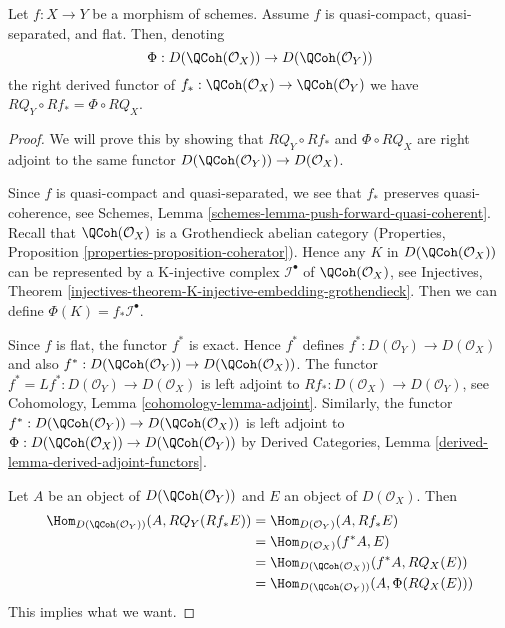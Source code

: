 \begin{lemma}
\label{lemma-flat-pushforward-coherator}
Let $f : X \to Y$ be a morphism of schemes. Assume $f$ is
quasi-compact, quasi-separated, and flat. Then, denoting
$$
\Phi : D(\QCoh(\mathcal{O}_X)) \to D(\QCoh(\mathcal{O}_Y))
$$
the right derived functor of
$f_* : \QCoh(\mathcal{O}_X) \to \QCoh(\mathcal{O}_Y)$
we have $RQ_Y \circ Rf_* = \Phi \circ RQ_X$.
\end{lemma}

\begin{proof}
We will prove this by showing that $RQ_Y \circ Rf_*$ and $\Phi \circ RQ_X$
are right adjoint to the same functor
$D(\QCoh(\mathcal{O}_Y)) \to D(\mathcal{O}_X)$.

\medskip\noindent
Since $f$ is quasi-compact and quasi-separated, we see that
$f_*$ preserves quasi-coherence, see
Schemes, Lemma \ref{schemes-lemma-push-forward-quasi-coherent}.
Recall that $\QCoh(\mathcal{O}_X)$ is a Grothendieck abelian category
(Properties, Proposition \ref{properties-proposition-coherator}).
Hence any $K$ in $D(\QCoh(\mathcal{O}_X))$
can be represented by a K-injective complex $\mathcal{I}^\bullet$
of $\QCoh(\mathcal{O}_X)$, see
Injectives, Theorem
\ref{injectives-theorem-K-injective-embedding-grothendieck}.
Then we can define $\Phi(K) = f_*\mathcal{I}^\bullet$.

\medskip\noindent
Since $f$ is flat, the functor $f^*$ is exact. Hence $f^*$ defines
$f^* : D(\mathcal{O}_Y) \to D(\mathcal{O}_X)$ and also
$f^* : D(\QCoh(\mathcal{O}_Y)) \to D(\QCoh(\mathcal{O}_X))$.
The functor $f^* = Lf^* : D(\mathcal{O}_Y) \to D(\mathcal{O}_X)$
is left adjoint to
$Rf_* : D(\mathcal{O}_X) \to D(\mathcal{O}_Y)$,
see Cohomology, Lemma \ref{cohomology-lemma-adjoint}.
Similarly, the functor
$f^* : D(\QCoh(\mathcal{O}_Y)) \to D(\QCoh(\mathcal{O}_X))$
is left adjoint to
$\Phi : D(\QCoh(\mathcal{O}_X)) \to D(\QCoh(\mathcal{O}_Y))$
by Derived Categories, Lemma \ref{derived-lemma-derived-adjoint-functors}.

\medskip\noindent
Let $A$ be an object of $D(\QCoh(\mathcal{O}_Y))$ and
$E$ an object of $D(\mathcal{O}_X)$. Then
\begin{align*}
\Hom_{D(\QCoh(\mathcal{O}_Y))}(A, RQ_Y(Rf_*E))
& =
\Hom_{D(\mathcal{O}_Y)}(A, Rf_*E) \\
& =
\Hom_{D(\mathcal{O}_X)}(f^*A, E) \\
& =
\Hom_{D(\QCoh(\mathcal{O}_X))}(f^*A, RQ_X(E)) \\
& =
\Hom_{D(\QCoh(\mathcal{O}_Y))}(A, \Phi(RQ_X(E)))
\end{align*}
This implies what we want.
\end{proof}

